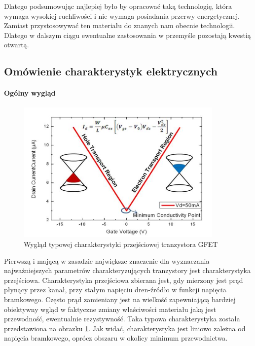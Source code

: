 Dlatego podsumowując najlepiej było by opracować taką technologię, która wymaga wysokiej ruchliwości i nie wymaga posiadania
przerwy energetycznej. Zamiast przystosowywać ten materiału do znanych nam obecnie technologii. Dlatego w dalszym ciągu
ewentualne zastosowania w przemyśle pozostają kwestią otwartą.



		\subsection{Omówienie charakterystyk elektrycznych}
			\paragraph{Ogólny wygląd}

	\begin{figure}[ht]
	\centering
	\includegraphics[width=0.90\textwidth]{./Rozdzial_3/obrazki/charakterystykaPrzej}
	\caption{Wygląd typowej charakterystyki przejściowej tranzystora GFET}
	\label{fig:GFET_trans} 
	\end{figure}

Pierwszą i mającą w zasadzie największe znaczenie dla wyznaczania najważniejszych parametrów charakteryzujących tranzystory 
jest charakterystyka przejściowa. Charakterystyka przejściowa zbierana jest, gdy mierzony jest prąd płynący przez kanał, 
przy stałym napięciu dren-źródło w funkcji napięcia bramkowego. Często prąd zamieniany jest na wielkość zapewniającą
bardziej obiektywny wgląd w faktyczne zmiany właściwości materiału jaką jest przewodność, ewentualnie rezystywność. 
Taka typowa charakterystyka została przedstawiona na obrazku \ref{fig:GFET_trans}. Jak widać, charakterystyka jest liniowo 
zależna od napięcia bramkowego, oprócz obszaru w okolicy minimum przewodnictwa. 



